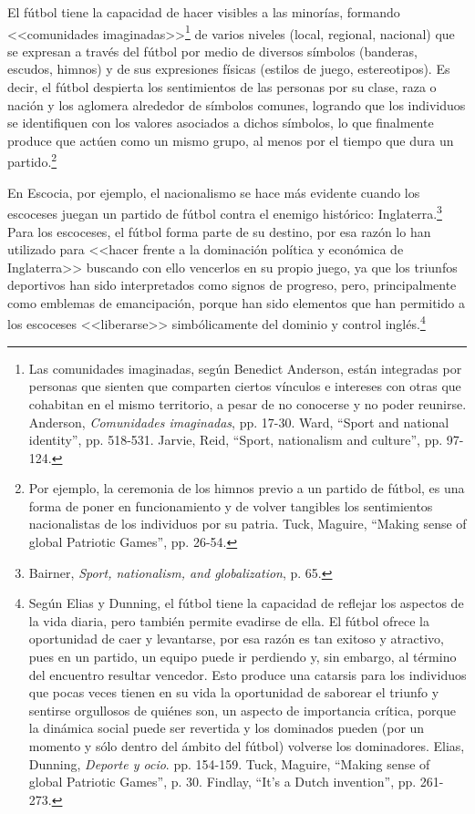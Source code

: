 \documentclass[11pt,a5paper,twoside]{book} %
\begin{document}
El fútbol tiene la capacidad de hacer visibles a las minorías, formando <<comunidades imaginadas>>\footnote{Las comunidades imaginadas, según Benedict Anderson, están integradas por personas que sienten que comparten ciertos vínculos e intereses con otras que cohabitan en el mismo territorio, a pesar de no conocerse y no poder reunirse. Anderson, \emph{Comunidades imaginadas}, pp. 17-30. Ward, ``Sport and national identity'', pp. 518-531. Jarvie, Reid, ``Sport, nationalism and culture'', pp. 97-124.} de varios niveles (local, regional, nacional) que se expresan a través del fútbol por medio de diversos símbolos (banderas, escudos, himnos) y de sus expresiones físicas (estilos de juego, estereotipos). Es decir, el fútbol despierta los sentimientos de las personas por su clase, raza o nación y los aglomera alrededor de símbolos comunes, logrando que los individuos se identifiquen con los valores asociados a dichos símbolos, lo que finalmente produce que actúen como un mismo grupo, al menos por el tiempo que dura un partido.\footnote{Por ejemplo, la ceremonia de los himnos previo a un partido de fútbol, es una forma de poner en funcionamiento y de volver tangibles los sentimientos nacionalistas de los individuos por su patria. Tuck, Maguire, ``Making sense of global Patriotic Games'', pp. 26-54.}

En Escocia, por ejemplo, el nacionalismo se hace más evidente cuando los escoceses juegan un partido de fútbol contra el enemigo histórico: Inglaterra.\footnote{Bairner, \emph{Sport, nationalism, and globalization}, p. 65.} Para los escoceses, el fútbol forma parte de su destino, por esa razón lo han utilizado para <<hacer frente a la dominación política y económica de Inglaterra>> buscando con ello vencerlos en su propio juego, ya que los triunfos deportivos han sido interpretados como signos de progreso, pero,
principalmente como emblemas de emancipación, porque han sido elementos que han permitido a los escoceses <<liberarse>> simbólicamente del dominio y control inglés.\footnote{Según Elias y Dunning, el fútbol tiene la capacidad de reflejar los aspectos de la vida diaria, pero también permite evadirse de ella. El fútbol ofrece la oportunidad de caer y levantarse, por esa razón es tan exitoso y atractivo, pues en un partido, un equipo puede ir perdiendo y, sin embargo, al término del encuentro resultar vencedor. Esto produce una catarsis para los individuos que pocas veces tienen en su vida la oportunidad de saborear el triunfo y sentirse orgullosos de quiénes son, un aspecto de importancia crítica, porque la dinámica social puede ser revertida y los dominados pueden (por un momento y sólo dentro del ámbito del fútbol) volverse los dominadores. Elias, Dunning, \emph{Deporte y ocio}. pp. 154-159. Tuck, Maguire, ``Making sense of global Patriotic Games'', p. 30. Findlay, ``It’s a Dutch invention'', pp. 261-273.}
\end{document}
